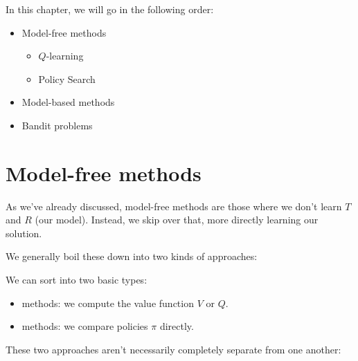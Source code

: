         In this chapter, we will go in the following order:

        \begin{itemize}
            \item Model-free methods
                \begin{itemize}
                    \item $Q$-learning
                    \item Policy Search
                \end{itemize}
            \item Model-based methods
            \item Bandit problems
        \end{itemize}


    \pagebreak

\section{Model-free methods}

    As we've already discussed, model-free methods are those where we don't learn $T$ and $R$ (our model). Instead, we skip over that, more directly learning our solution.

    We generally boil these down into two kinds of approaches:\\

    \begin{definition}
        We can sort  into two basic types:

        \begin{itemize}
            \item {} methods: we compute the value function $V$ or $Q$.
            \item {} methods: we compare policies $\pi$ directly.
        \end{itemize}

        
    \end{definition}

    These two approaches aren't necessarily completely separate from one another:\\

